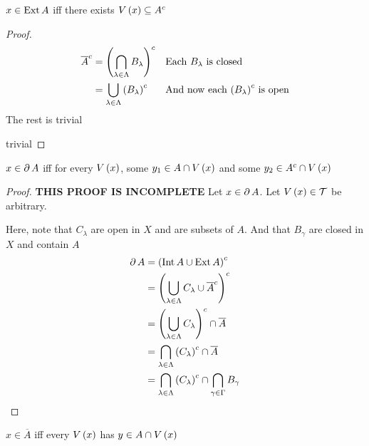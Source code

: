 \documentclass{article}
\begin{document}
\begin{proposition}
\label{book:prop:2.8b}
    $x \in \textnormal{Ext} \, A$ iff there exists $V\left(x\right) \subseteq A^c$
\end{proposition}
\begin{proof}
    \forwarddir 
    \begin{align*}
        \overline{A}^c &= \left(\bigcap_{\lambda \in \Lambda} B_\lambda\right)^c  &&\text{Each $B_\lambda$ is closed} \\
        &= \bigcup_{\lambda \in \Lambda} \left(B_\lambda\right)^c && \text{And now each $\left(B_\lambda\right)^c$ is open}
    \end{align*}
    The rest is trivial
    
    \conversedir trivial
    
\end{proof}
\begin{proposition}
\label{book:prop:2.8c}
    $x \in \partial \, A$ iff for every $V\left(x\right)$, some $y_1 \in A \cap V\left(x\right)$ and 
    some $y_2 \in A^c \cap V\left(x\right)$
\end{proposition}
\begin{proof}
    \textbf{THIS PROOF IS INCOMPLETE}
    \forwarddir Let $x \in \partial \, A$. Let $V\left(x\right) \in \mathcal{T}$ be arbitrary.

    Here, note that $C_\lambda$ are open in $X$ and are subsets of $A$.
    And that $B_\gamma$ are closed in $X$ and contain $A$
    \begin{align*}
        \partial \, A &= \left(\textnormal{Int} \, A \cup \textnormal{Ext} \, A\right)^c \\
        &= \left(\bigcup_{\lambda \in \Lambda} C_\lambda \cup \overline{A}^c\right)^c \\ 
        &= \left(\bigcup_{\lambda \in \Lambda} C_\lambda\right)^c \cap \overline{A} \\
        &= \bigcap_{\lambda \in \Lambda} \left(C_\lambda\right)^c \cap \overline{A} \\
        &= \bigcap_{\lambda \in \Lambda} \left(C_\lambda\right)^c \cap \bigcap_{\gamma \in \Gamma} B_\gamma
    \end{align*}
\end{proof}
\begin{proposition}
\label{book:prop:2.8d}
    $x \in \overline{A}$ iff every $V\left(x\right)$ has $y \in A \cap V\left(x\right)$
\end{proposition}
\end{document}
